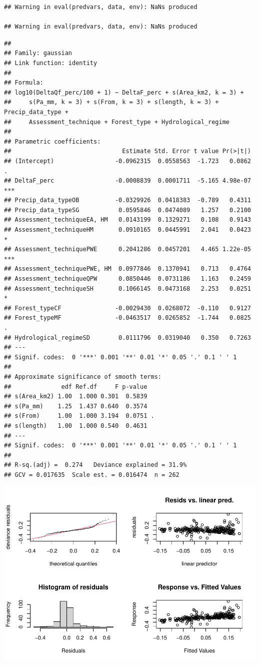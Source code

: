 \documentclass[]{elsarticle} %
\begin{document}
\begin{verbatim}
## Warning in eval(predvars, data, env): NaNs produced

## Warning in eval(predvars, data, env): NaNs produced
\end{verbatim}

\begin{verbatim}
## 
## Family: gaussian 
## Link function: identity 
## 
## Formula:
## log10(DeltaQf_perc/100 + 1) ~ DeltaF_perc + s(Area_km2, k = 3) + 
##     s(Pa_mm, k = 3) + s(From, k = 3) + s(length, k = 3) + Precip_data_type + 
##     Assessment_technique + Forest_type + Hydrological_regime
## 
## Parametric coefficients:
##                               Estimate Std. Error t value Pr(>|t|)    
## (Intercept)                 -0.0962315  0.0558563  -1.723   0.0862 .  
## DeltaF_perc                 -0.0008839  0.0001711  -5.165 4.98e-07 ***
## Precip_data_typeOB          -0.0329926  0.0418383  -0.789   0.4311    
## Precip_data_typeSG           0.0595846  0.0474089   1.257   0.2100    
## Assessment_techniqueEA, HM   0.0143199  0.1329271   0.108   0.9143    
## Assessment_techniqueHM       0.0910165  0.0445991   2.041   0.0423 *  
## Assessment_techniquePWE      0.2041286  0.0457201   4.465 1.22e-05 ***
## Assessment_techniquePWE, HM  0.0977846  0.1370941   0.713   0.4764    
## Assessment_techniqueQPW      0.0850446  0.0731186   1.163   0.2459    
## Assessment_techniqueSH       0.1066145  0.0473168   2.253   0.0251 *  
## Forest_typeCF               -0.0029430  0.0268072  -0.110   0.9127    
## Forest_typeMF               -0.0463517  0.0265852  -1.744   0.0825 .  
## Hydrological_regimeSD        0.0111796  0.0319040   0.350   0.7263    
## ---
## Signif. codes:  0 '***' 0.001 '**' 0.01 '*' 0.05 '.' 0.1 ' ' 1
## 
## Approximate significance of smooth terms:
##              edf Ref.df     F p-value  
## s(Area_km2) 1.00  1.000 0.301  0.5839  
## s(Pa_mm)    1.25  1.437 0.640  0.3574  
## s(From)     1.00  1.000 3.194  0.0751 .
## s(length)   1.00  1.000 0.540  0.4631  
## ---
## Signif. codes:  0 '***' 0.001 '**' 0.01 '*' 0.05 '.' 0.1 ' ' 1
## 
## R-sq.(adj) =  0.274   Deviance explained = 31.9%
## GCV = 0.017635  Scale est. = 0.016474  n = 262
\end{verbatim}

\includegraphics{Forest_and_Water_files/figure-latex/model2b-1.pdf}
\end{document}
